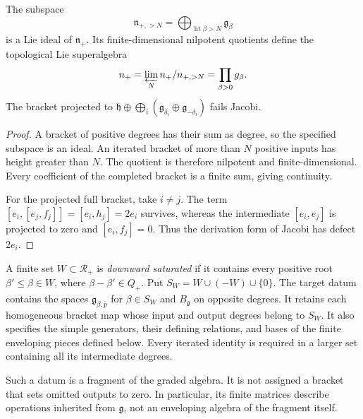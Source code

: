 \begin{proposition}
\label{prop:bkm-positive-completion}
The subspace
\[
 \mathfrak n_{+,>N}
 =\bigoplus_{\operatorname{ht}\beta>N}\mathfrak g_\beta
\]
is a Lie ideal of $\mathfrak n_+$. Its finite-dimensional nilpotent
quotients define the topological Lie superalgebra
\[
 \widehat{\mathfrak n}_+
 =\varprojlim_N\mathfrak n_+/\mathfrak n_{+,>N}
 =\prod_{\beta>0}\mathfrak g_\beta.
\]
The bracket projected to
$\mathfrak h\oplus\bigoplus_i(\mathfrak g_{\delta_i}
\oplus\mathfrak g_{-\delta_i})$ fails Jacobi.
\end{proposition}
\begin{proof}
A bracket of positive degrees has their sum as degree, so the
specified subspace is an ideal. An iterated bracket of more than
$N$ positive inputs has height greater than $N$. The quotient is
therefore nilpotent and finite-dimensional. Every coefficient of
the completed bracket is a finite sum, giving continuity.

For the projected full bracket, take $i\ne j$.
The term $[e_i,[e_j,f_j]]=[e_i,h_j]=2e_i$ survives,
whereas the intermediate $[e_i,e_j]$ is projected to zero and
$[e_i,f_j]=0$. Thus the derivation form of Jacobi has defect $2e_i$.
\end{proof}

\begin{definition}
\label{def:bkm-finite-target-presentation-datum}
A finite set $W\subset\mathcal R_+$ is \emph{downward saturated} if it
contains every positive root $\beta'\leq\beta\in W$, where
$\beta-\beta'\in Q_+$. Put $S_W=W\cup(-W)\cup\{0\}$.
The target datum contains the spaces $\mathfrak g_{\beta,\bar p}$
for $\beta\in S_W$ and $B_{\mathfrak g}$ on opposite degrees.
It retains each homogeneous bracket map whose input and output
degrees belong to $S_W$. It also specifies the
simple generators, their defining relations, and bases of the
finite enveloping pieces defined below. Every iterated identity
is required in a larger set containing all its intermediate degrees.
\end{definition}

Such a datum is a fragment of the graded algebra. It is not assigned
a bracket that sets omitted outputs to zero. In particular, its
finite matrices describe operations inherited from $\mathfrak g$,
not an enveloping algebra of the fragment itself.


